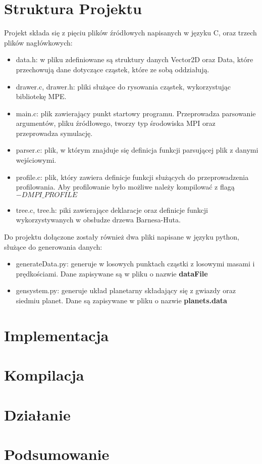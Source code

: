 \documentclass[11pt, titlepage]{article}
\begin{document}
\section{Struktura Projektu}
\hspace{11pt} Projekt składa się z pięciu plików źródłowych napisanych w języku C, oraz trzech plików nagłówkowych:
\begin{itemize}
\item data.h: w pliku zdefiniowane są struktury danych Vector2D oraz Data, które przechowują dane dotyczące cząstek, które ze sobą oddziałują.
\item drawer.c, drawer.h: pliki służące do rysowania cząstek, wykorzystując bibliotekę MPE.
\item main.c: plik zawierający punkt startowy programu. Przeprowadza parsowanie argumentów, pliku źródłowego, tworzy typ środowiska MPI oraz przeprowadza symulację.
\item parser.c: plik, w którym znajduje się definicja funkcji parsującej plik z danymi wejściowymi.
\item profile.c: plik, który zawiera definicje funkcji służących do przeprowadzenia profilowania. Aby profilowanie było możliwe należy kompilować z flagą \textbf{$-DMPI\_PROFILE$}
\item tree.c, tree.h: piki zawierające deklaracje oraz definicje funkcji wykorzystywanych w obsłudze drzewa Barnesa-Huta.
\end{itemize}

Do projektu dołączone zostały również dwa pliki napisane w języku python, służące do generowania danych:
\begin{itemize}
\item generateData.py: generuje w losowych punktach cząstki z losowymi masami i prędkościami. Dane zapisywane są w pliku o nazwie \textbf{dataFile}
\item gensystem.py: generuje układ planetarny składający się z gwiazdy oraz siedmiu planet. Dane są zapisywane w pliku o nazwie \textbf{planets.data}
\end{itemize}
\section{Implementacja}
\section{Kompilacja}
\section{Działanie}
\section{Podsumowanie}
\end{document}
